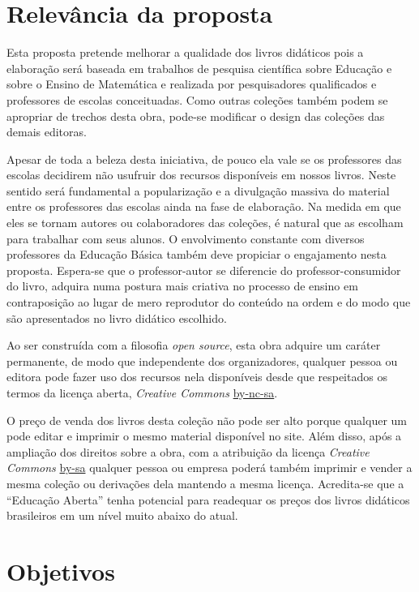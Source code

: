 \documentclass[10 pt]{article}
\begin{document}
\section{Relevância da proposta}

Esta proposta pretende melhorar a qualidade dos livros didáticos pois a elaboração será baseada em trabalhos de pesquisa científica sobre Educação e sobre o Ensino de Matemática e realizada por pesquisadores qualificados e professores de escolas conceituadas. 
Como outras coleções também podem se apropriar de trechos desta obra, pode-se modificar o design das coleções das demais editoras.

Apesar de toda a beleza desta iniciativa, de pouco ela vale se os professores das escolas decidirem não usufruir dos recursos disponíveis em nossos livros.
Neste sentido será fundamental a popularização e a divulgação massiva do material entre os professores das escolas ainda na fase de elaboração.
Na medida em que eles se tornam autores ou colaboradores das coleções, é natural que as escolham para trabalhar com seus alunos.
O envolvimento constante com diversos professores da Educação Básica também deve propiciar o engajamento nesta proposta.
Espera-se que o professor-autor se diferencie do professor-consumidor do livro, adquira numa postura mais criativa no processo de ensino em contraposição ao lugar de mero reprodutor do conteúdo na ordem e do modo que são apresentados no livro didático escolhido.

Ao ser construída com a filosofia {\it open source}, esta obra adquire um caráter permanente, de modo que independente dos organizadores, qualquer pessoa ou editora pode fazer uso dos recursos nela disponíveis desde que respeitados os termos da licença aberta, {\it Creative Commons} \href{http://creativecommons.org/licenses/by-nc-sa/3.0/br/}{by-nc-sa}. 

O preço de venda dos livros desta coleção não pode ser alto porque qualquer um pode editar e imprimir o mesmo material disponível no site.
Além disso, após a ampliação dos direitos sobre a obra, com a atribuição da licença {\it Creative Commons} \href{https://creativecommons.org/licenses/by-sa/4.0/deed.pt_BR}{by-sa} qualquer pessoa ou empresa poderá também imprimir e vender a mesma coleção ou derivações dela mantendo a mesma licença.
Acredita-se que a ``Educação Aberta'' tenha potencial para readequar os preços dos livros didáticos brasileiros em um nível muito abaixo do atual.

\section{Objetivos}
\end{document}
